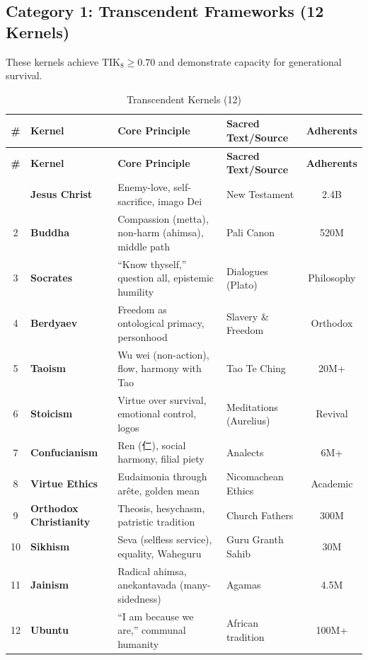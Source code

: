 \documentclass[11pt,a4paper]{article}
\theoremstyle{definition}
\theoremstyle{remark}
\newcommand{\TIKeight}{\text{TIK}_8}
\begin{document}
\subsection{Category 1: Transcendent Frameworks (12 Kernels)}

These kernels achieve $\TIKeight \geq 0.70$ and demonstrate capacity for generational survival.

\begin{longtable}{@{}clp{4cm}p{3.5cm}c@{}}
\caption{Transcendent Kernels (12)} \label{tab:transcendent-kernels} \\
\toprule
\textbf{\#} & \textbf{Kernel} & \textbf{Core Principle} & \textbf{Sacred Text/Source} & \textbf{Adherents} \\
\midrule
\endfirsthead
\toprule
\textbf{\#} & \textbf{Kernel} & \textbf{Core Principle} & \textbf{Sacred Text/Source} & \textbf{Adherents} \\
\midrule
\endhead
\bottomrule
\endlastfoot
1 & \textbf{Jesus Christ} & Enemy-love, self-sacrifice, imago Dei & New Testament & 2.4B \\
2 & \textbf{Buddha} & Compassion (metta), non-harm (ahimsa), middle path & Pali Canon & 520M \\
3 & \textbf{Socrates} & ``Know thyself,'' question all, epistemic humility & Dialogues (Plato) & Philosophy \\
4 & \textbf{Berdyaev} & Freedom as ontological primacy, personhood & Slavery \& Freedom & Orthodox \\
5 & \textbf{Taoism} & Wu wei (non-action), flow, harmony with Tao & Tao Te Ching & 20M+ \\
6 & \textbf{Stoicism} & Virtue over survival, emotional control, logos & Meditations (Aurelius) & Revival \\
7 & \textbf{Confucianism} & Ren (仁), social harmony, filial piety & Analects & 6M+ \\
8 & \textbf{Virtue Ethics} & Eudaimonia through arête, golden mean & Nicomachean Ethics & Academic \\
9 & \textbf{Orthodox Christianity} & Theosis, hesychasm, patristic tradition & Church Fathers & 300M \\
10 & \textbf{Sikhism} & Seva (selfless service), equality, Waheguru & Guru Granth Sahib & 30M \\
11 & \textbf{Jainism} & Radical ahimsa, anekantavada (many-sidedness) & Agamas & 4.5M \\
12 & \textbf{Ubuntu} & ``I am because we are,'' communal humanity & African tradition & 100M+ \\
\end{longtable}
\end{document}
